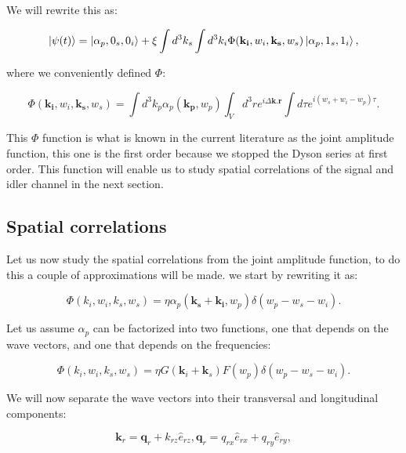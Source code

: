 \documentclass[12pt]{book}
\begin{document}
We will rewrite this as:

\begin{equation}
\ket{\psi(t)}=\ket{\alpha_{p},0_{s},0_{i}}+\xi \int d^{3}k_{s}\int d^{3}k_{i}
\Phi(\mathbf{k_{i}},w_{i},\mathbf{k_{s}},w_{s})\ket{\alpha_{p},1_{s},1_{i}},
\end{equation}

where we conveniently defined $\Phi$:

\begin{equation}
\Phi(\mathbf{k_{i}},w_{i},\mathbf{k_{s}},w_{s})=\int d^{3}k_{p} \alpha_{p}(\mathbf{k_{p}},w_{p}) \int_{V} d^{3}r e^{i \Delta \mathbf{k}.\mathbf{r}} \int d\tau e^{i(w_{s}+w_{i}-w_{p})\tau}.
\end{equation}

This $\Phi$ function is what is known in the current literature as the joint amplitude function, this one is the first order because we stopped the Dyson series at first order. This function will enable us to study spatial correlations of the signal and idler channel in the next section.

\subsection{Spatial correlations}

Let us now study the spatial correlations from the joint amplitude function, to do this a couple of approximations will be made. we start by rewriting it as:

\begin{equation}
\Phi(k_{i},w_{i},k_{s},w_{s})= \eta \alpha_{p}(\mathbf{k_{s}}+\mathbf{k_{i}},w_{p}) \delta(w_{p}-w_{s}-w_{i}).
\end{equation}


Let us assume  $\alpha_{p}$ can be factorized into two functions, one that depends on the wave vectors, and one that depends on the frequencies:

\begin{equation}
\Phi(k_{i},w_{i},k_{s},w_{s})= \eta G(\mathbf{k}_{i}+\mathbf{k}_{s}) F(w_{p}) \delta(w_{p}-w_{s}-w_{i}).
\end{equation}
  
We  will now separate the wave vectors into their transversal and longitudinal components:

\begin{equation}
\mathbf{k}_{r}=\mathbf{q}_{r}+k_{rz} \hat{e}_{rz},\mathbf{q}_{r}=q_{rx} \hat{e}_{rx}+q_{ry} \hat{e}_{ry},
\end{equation}
\end{document}
